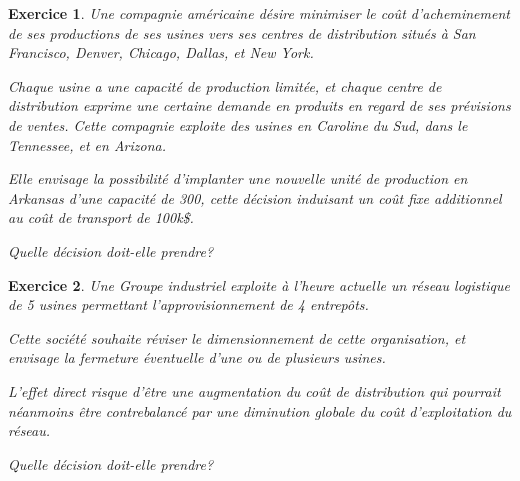 \documentclass[french]{beamer}
\newtheorem{exercice}{Exercice}
\begin{document}
\begin{frame}
  \begin{exercice}
    Une  compagnie américaine  désire minimiser  le coût  d’acheminement de  ses
    productions de  ses usines  vers ses  centres de  distribution situés  à San
    Francisco, Denver, Chicago, Dallas, et New York.

    Chaque usine a une capacité
    de production limitée, et chaque centre de distribution exprime une certaine
    demande en produits  en regard de ses prévisions de  ventes. Cette compagnie
    exploite  des  usines  en  Caroline  du   Sud,  dans  le  Tennessee,  et  en
    Arizona.

    Elle envisage  la possibilité  d’implanter une  nouvelle unité  de
    production en  Arkansas d’une capacité  de 300, cette décision  induisant un
    coût fixe additionnel au coût de transport de 100k\$.

    Quelle  décision
    doit-elle prendre? 
  \end{exercice}
\end{frame}



\begin{frame}
  \begin{exercice}
    Une Groupe industriel exploite à l’heure  actuelle un réseau logistique de 5
    usines permettant l’approvisionnement de 4 entrepôts.

    Cette société souhaite réviser le  dimensionnement de cette organisation, et
    envisage la fermeture éventuelle d’une ou de plusieurs usines.

    L’effet direct  risque d’être une  augmentation du coût de  distribution qui
    pourrait néanmoins  être contrebalancé  par une  diminution globale  du coût
    d’exploitation du réseau.

    Quelle décision doit-elle prendre?
  \end{exercice}
\end{frame}
\end{document}
